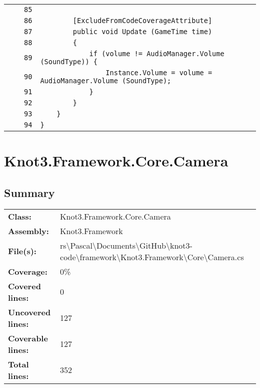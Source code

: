 \documentclass[a4paper,10pt]{article}
\begin{document}
\begin{longtable}[l]{lrrl}
\cellcolor{gray} &  & \verb~85~ & \verb~~\\
\cellcolor{gray} &  & \verb~86~ & \verb~        [ExcludeFromCodeCoverageAttribute]~\\
\cellcolor{gray} &  & \verb~87~ & \verb~        public void Update (GameTime time)~\\
\cellcolor{gray} &  & \verb~88~ & \verb~        {~\\
\cellcolor{gray} &  & \verb~89~ & \verb~            if (volume != AudioManager.Volume (SoundType)) {~\\
\cellcolor{gray} &  & \verb~90~ & \verb~                Instance.Volume = volume = AudioManager.Volume (SoundType);~\\
\cellcolor{gray} &  & \verb~91~ & \verb~            }~\\
\cellcolor{gray} &  & \verb~92~ & \verb~        }~\\
\cellcolor{gray} &  & \verb~93~ & \verb~    }~\\
\cellcolor{gray} &  & \verb~94~ & \verb~}~\\
\end{longtable}
\newpage
\section{Knot3.Framework.Core.Camera}
\subsection{Summary}
\begin{longtable}[l]{ll}
\textbf{Class:} & Knot3.Framework.Core.Camera\\
\textbf{Assembly:} & Knot3.Framework\\
\textbf{File(s):} & \begin{minipage}[t]{12cm}{rs\textbackslash Pascal\textbackslash Documents\textbackslash GitHub\textbackslash knot3-code\textbackslash framework\textbackslash Knot3.Framework\textbackslash Core\textbackslash Camera.cs}\end{minipage} \\
\textbf{Coverage:} & 0\%\\
\textbf{Covered lines:} & 0\\
\textbf{Uncovered lines:} & 127\\
\textbf{Coverable lines:} & 127\\
\textbf{Total lines:} & 352\\
\end{longtable}
\end{document}
